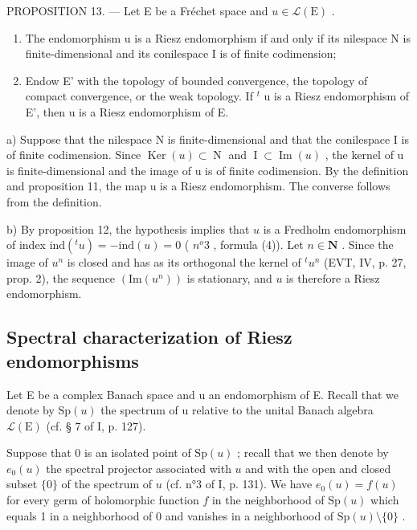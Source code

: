 PROPOSITION 13. --- Let E be a Fréchet space and \(u \in \mathcal{L}(\mathrm{E})\) .

\begin{enumerate}
\def\labelenumi{\alph{enumi})}
\item
  The endomorphism u is a Riesz endomorphism if and only if its nilespace N is finite-dimensional and its conilespace I is of finite codimension;
\item
 Endow E' with the topology of bounded convergence, the topology of compact convergence, or the weak topology. If \(^{t}\) u is a Riesz endomorphism of E', then u is a Riesz endomorphism of E.
\end{enumerate}
a) Suppose that the nilespace N is finite-dimensional and that the conilespace I is of finite codimension. Since \(\operatorname{Ker}(u) \subset \operatorname{N}\) and \(\operatorname{I} \subset \operatorname{Im}(u)\) , the kernel of u is finite-dimensional and the image of u is of finite codimension. By the definition and proposition 11, the map u is a Riesz endomorphism. The converse follows from the definition.

b) By proposition 12, the hypothesis implies that \(u\) is a Fredholm endomorphism of index \(\text{ind}(^t u) = -\text{ind}(u) = 0\) ( \(n^o 3\) , formula (4)). Let \(n \in \mathbf{N}\) . Since the image of \(u^n\) is closed and has as its orthogonal the kernel of \(^t u^n\) (EVT, IV, p. 27, prop. 2), the sequence \((\text{Im}(u^n))\) is stationary, and \(u\) is therefore a Riesz endomorphism.


\subsection{Spectral characterization of Riesz endomorphisms}

Let E be a complex Banach space and u an endomorphism of E. Recall that we denote by \(\mathrm{Sp}(u)\) the spectrum of u relative to the unital Banach algebra \(\mathcal{L}(\mathrm{E})\) (cf. § 7 of I, p. 127).

Suppose that 0 is an isolated point of \(\mathrm{Sp}(u)\) ; recall that we then denote by \(e_0(u)\) the spectral projector associated with \(u\) and with the open and closed subset \(\{0\}\) of the spectrum of \(u\) (cf. n°3 of I, p. 131). We have \(e_0(u) = f(u)\) for every germ of holomorphic function \(f\) in the neighborhood of \(\mathrm{Sp}(u)\) which equals 1 in a neighborhood of 0 and vanishes in a neighborhood of \(\mathrm{Sp}(u) \setminus \{0\}\) .

